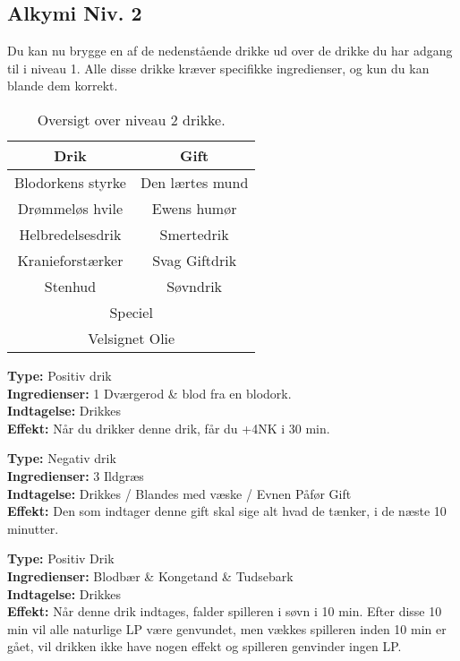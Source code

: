 \subsection{Alkymi Niv. 2}
Du kan nu brygge en af de nedenstående drikke ud over de drikke du har adgang til i niveau 1. Alle disse drikke kræver specifikke ingredienser, og kun du kan blande dem korrekt.\\

\begin{table}[H]
    \centering
    \begin{tabular}{|c|c|}
        \rowcolor{cerulean!80}\hline
        Drik & Gift \\\hline
        Blodorkens styrke &  Den lærtes mund \\\hline
        Drømmeløs hvile & Ewens humør \\\hline
        Helbredelsesdrik & Smertedrik \\\hline
        Kranieforstærker & Svag Giftdrik\\\hline
        Stenhud &  Søvndrik\\\hline
        \multicolumn{2}{|c|}{Speciel} \\\hline
        \multicolumn{2}{|c|}{Velsignet Olie} \\\hline
    \end{tabular}
    \caption{Oversigt over niveau 2 drikke.}
\end{table}

\begin{drik*}
\textbf{Type:} Positiv drik \\
\textbf{Ingredienser:} 1 Dværgerod \& blod fra en blodork.\\
\textbf{Indtagelse:} Drikkes\\
\textbf{Effekt:} Når du drikker denne drik, får du +4NK i 30 min.
\end{drik*}

\begin{gift*}
\textbf{Type:} Negativ drik\\
\textbf{Ingredienser:} 3 Ildgræs\\
\textbf{Indtagelse:} Drikkes / Blandes med væske / Evnen Påfør Gift\\
\textbf{Effekt:} Den som indtager denne gift skal sige alt hvad de tænker, i de næste 10 minutter.
\end{gift*}

\begin{drik*}
\textbf{Type:} Positiv Drik\\
\textbf{Ingredienser:} Blodbær \& Kongetand \& Tudsebark \\
\textbf{Indtagelse:} Drikkes\\
\textbf{Effekt:} Når denne drik indtages, falder spilleren i søvn i 10 min. Efter disse 10 min vil alle naturlige LP være genvundet, men vækkes spilleren inden 10 min er gået, vil drikken ikke have nogen effekt og spilleren genvinder ingen LP.\\
\end{drik*}

